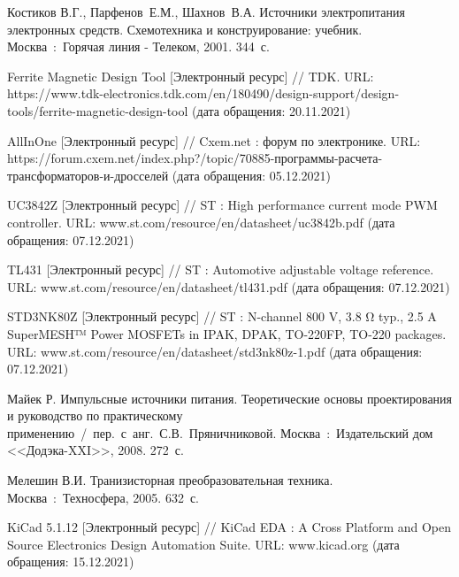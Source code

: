 \documentclass[utf8x, 14pt, oneside, a4paper]{article}
\begin{document}
	\begin{thebibliography}{3}
		
		Костиков В.Г., Парфенов~Е.М., Шахнов~В.А. Источники электропитания электронных средств. Схемотехника и конструирование: учебник. Москва~:~Горячая линия - Телеком, 2001. 344~с.
		
		\vspace{-4mm}
		Ferrite Magnetic Design Tool [Электронный ресурс] // TDK. URL: https://www.tdk-electronics.tdk.com/en/180490/design-support/design-tools/ferrite-magnetic-design-tool (дата обращения: 20.11.2021)
		
		\vspace{-4mm}
		AllInOne [Электронный ресурс] // Cxem.net : форум по электронике. URL: https://forum.cxem.net/index.php?/topic/70885-программы-расчета-трансформаторов-и-дросселей (дата обращения: 05.12.2021)
	
		\vspace{-4mm}
		UC3842Z [Электронный ресурс] // ST : High performance current mode PWM controller. URL: www.st.com/resource/en/datasheet/uc3842b.pdf (дата обращения: 07.12.2021)
	
		\vspace{-4mm}
		TL431  [Электронный ресурс] // ST : Automotive adjustable voltage reference. URL: www.st.com/resource/en/datasheet/tl431.pdf (дата обращения: 07.12.2021)
	
		\vspace{-4mm}
		STD3NK80Z  [Электронный ресурс] // ST : N-channel 800 V, 3.8 Ω typ., 2.5 A SuperMESH™
		Power MOSFETs in IPAK, DPAK, TO-220FP, TO-220 packages. URL: www.st.com/resource/en/datasheet/std3nk80z-1.pdf (дата обращения: 07.12.2021)
		
		\vspace{-4mm}
		Майек Р. Импульсные источники питания. Теоретические основы проектирования и руководство по практическому применению~/~пер.~с~анг.~С.В.~Пряничниковой. Москва~:~Издательский дом <<Додэка-XXI>>, 2008. 272~с.
		
		\vspace{-4mm}
		Мелешин В.И. Транизисторная преобразовательная техника. Москва~:~Техносфера, 2005. 632~с.
	
		\vspace{-4mm}
		KiCad 5.1.12  [Электронный ресурс] // KiCad EDA : A Cross Platform and Open Source Electronics Design Automation Suite. URL: www.kicad.org (дата обращения: 15.12.2021)
	

\end{thebibliography}
\end{document}
